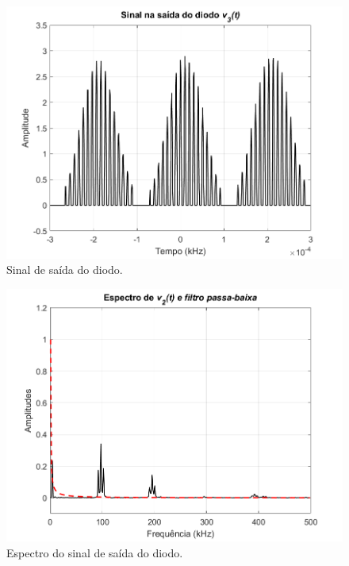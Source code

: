 \documentclass[a4paper,12pt,oneside,openany,table,xcdraw]{article}
\begin{document}
\vspace{0.3cm}
\begin{figure}[H]
\centering
\includegraphics[width=\textwidth]{ex2_diodo_3}
\caption{Sinal de saída do diodo.}
\label{23:1}
\end{figure}

\vspace{0.3cm}
\begin{figure}[H]
\centering
\includegraphics[width=\textwidth]{ex2_espectro_diodo_3}
\caption{Espectro do sinal de saída do diodo.}
\label{23:2}
\end{figure}
\end{document}
